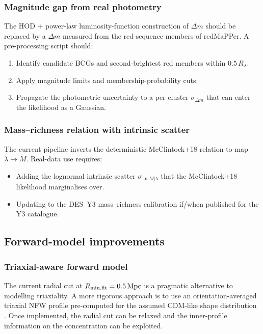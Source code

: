 \documentclass[11pt,a4paper]{article}
\newcommand{\dm}{\Delta m}
\newcommand{\Rmin}{R_{\rm min,fit}}
\begin{document}
\subsubsection*{Magnitude gap from real photometry}

The HOD + power-law luminosity-function construction of $\dm$ should be
replaced by a $\dm$ measured from the red-sequence members of redMaPPer.
A pre-processing script should:
\begin{enumerate}[noitemsep]
  \item Identify candidate BCGs and second-brightest red members within
        $0.5\,R_\lambda$.
  \item Apply magnitude limits and membership-probability cuts.
  \item Propagate the photometric uncertainty to a per-cluster $\sigma_{\dm}$
        that can enter the likelihood as a Gaussian.
\end{enumerate}

\subsubsection*{Mass--richness relation with intrinsic scatter}

The current pipeline inverts the deterministic McClintock+18
\citep{McClintock2018} relation to map $\lambda \to M$.  Real-data use requires:
\begin{itemize}[noitemsep]
  \item Adding the lognormal intrinsic scatter $\sigma_{\ln M | \lambda}$ that
        the McClintock+18 likelihood marginalises over.
  \item Updating to the DES~Y3 mass--richness calibration if/when published
        for the Y3 catalogue.
\end{itemize}

\subsection{Forward-model improvements}

\subsubsection*{Triaxial-aware forward model}

The current radial cut at $\Rmin=0.5\,\mathrm{Mpc}$ is a pragmatic alternative
to modelling triaxiality.  A more rigorous approach is to use an
orientation-averaged triaxial NFW profile pre-computed for the assumed CDM-like
shape distribution \citep{Oguri2012, Corless2007, JingSuto2002}.  Once
implemented, the radial cut can be relaxed and the inner-profile information
on the concentration can be exploited.
\end{document}
